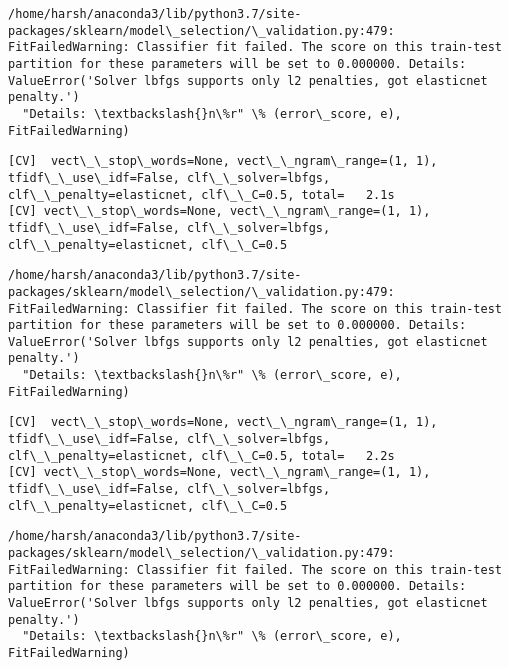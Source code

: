 \documentclass[11pt]{article}
\begin{document}
    \begin{Verbatim}[commandchars=\\\{\}]
/home/harsh/anaconda3/lib/python3.7/site-packages/sklearn/model\_selection/\_validation.py:479: FitFailedWarning: Classifier fit failed. The score on this train-test partition for these parameters will be set to 0.000000. Details: 
ValueError('Solver lbfgs supports only l2 penalties, got elasticnet penalty.')
  "Details: \textbackslash{}n\%r" \% (error\_score, e), FitFailedWarning)

    \end{Verbatim}

    \begin{Verbatim}[commandchars=\\\{\}]
[CV]  vect\_\_stop\_words=None, vect\_\_ngram\_range=(1, 1), tfidf\_\_use\_idf=False, clf\_\_solver=lbfgs, clf\_\_penalty=elasticnet, clf\_\_C=0.5, total=   2.1s
[CV] vect\_\_stop\_words=None, vect\_\_ngram\_range=(1, 1), tfidf\_\_use\_idf=False, clf\_\_solver=lbfgs, clf\_\_penalty=elasticnet, clf\_\_C=0.5 

    \end{Verbatim}

    \begin{Verbatim}[commandchars=\\\{\}]
/home/harsh/anaconda3/lib/python3.7/site-packages/sklearn/model\_selection/\_validation.py:479: FitFailedWarning: Classifier fit failed. The score on this train-test partition for these parameters will be set to 0.000000. Details: 
ValueError('Solver lbfgs supports only l2 penalties, got elasticnet penalty.')
  "Details: \textbackslash{}n\%r" \% (error\_score, e), FitFailedWarning)

    \end{Verbatim}

    \begin{Verbatim}[commandchars=\\\{\}]
[CV]  vect\_\_stop\_words=None, vect\_\_ngram\_range=(1, 1), tfidf\_\_use\_idf=False, clf\_\_solver=lbfgs, clf\_\_penalty=elasticnet, clf\_\_C=0.5, total=   2.2s
[CV] vect\_\_stop\_words=None, vect\_\_ngram\_range=(1, 1), tfidf\_\_use\_idf=False, clf\_\_solver=lbfgs, clf\_\_penalty=elasticnet, clf\_\_C=0.5 

    \end{Verbatim}

    \begin{Verbatim}[commandchars=\\\{\}]
/home/harsh/anaconda3/lib/python3.7/site-packages/sklearn/model\_selection/\_validation.py:479: FitFailedWarning: Classifier fit failed. The score on this train-test partition for these parameters will be set to 0.000000. Details: 
ValueError('Solver lbfgs supports only l2 penalties, got elasticnet penalty.')
  "Details: \textbackslash{}n\%r" \% (error\_score, e), FitFailedWarning)

    \end{Verbatim}
\end{document}
